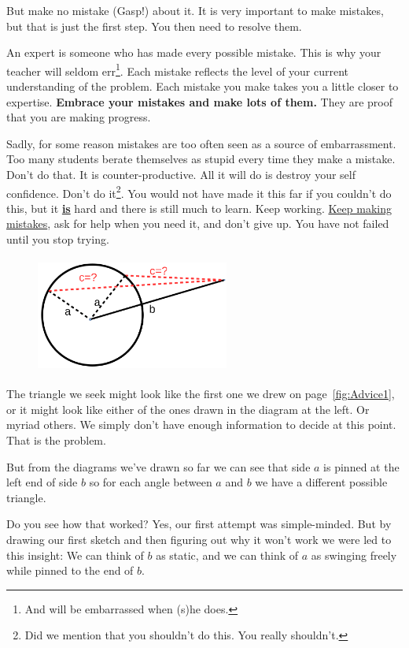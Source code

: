 But make no mistake {\sc (Gasp!)} about it. It is very important to
make mistakes, but that is just the first step. You then need to
resolve them.

An expert is someone who has made every possible mistake. This is why
your teacher will seldom err\footnote{And will be embarrassed when
  (s)he does.}. Each mistake reflects the level of your current
understanding of the problem. Each mistake you make takes you a little
closer to expertise.  {\bf Embrace your mistakes and make lots of them.}
They are proof that you are making progress.

Sadly, for some reason mistakes are too often seen as a source of
embarrassment. Too many students berate themselves as stupid every
time they make a mistake. Don't do that. It is counter-productive. All
it will do is destroy your self confidence. Don't do it\footnote{Did
  we mention that you shouldn't do this. You really shouldn't.}. You
would not have made it this far if you couldn't do this, but it
\underline{\bf{}is} hard and there is still much to learn.  Keep
working. \underline{Keep making mistakes}, ask for help when you need
it, and don't give up. You have not failed until you stop trying.

\begin{figure}
\captionsetup{labelformat=empty}
\centerline{\includegraphics*[height=1.5in,width=2.5in]{Figures/Advice3}}
\label{fig:Advice3}
\end{figure}
The triangle we seek might look like the first one we drew on
page~\ref{fig:Advice1}, or it might look like either of the ones drawn
in the diagram at the left. Or myriad others. We simply don't have
enough information to decide at this point. That is the problem.

But from the diagrams we've drawn so far we can see that side
$a$ is pinned at the left end of side $b$ so for each angle between
$a$ and $b$ we have a different possible triangle. 

Do you see how that worked? Yes, our first attempt was simple-minded.
But by drawing our first sketch and then figuring out why it won't work
we were led to this insight: We can think of $b$ as static, and we can
think of $a$ as swinging freely while pinned to the end of $b.$

